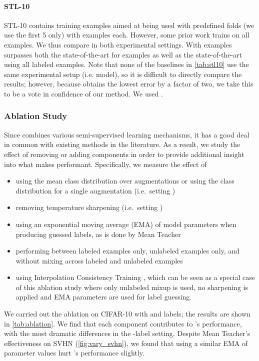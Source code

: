 \documentclass{article}
\begin{document}
\paragraph{STL-10}
STL-10 contains  training examples aimed at being used with  predefined folds (we use the first 5 only) with  examples each.
However, some prior work trains on all  examples.
We thus compare in both experimental settings.
With  examples  surpasses both the state-of-the-art for  examples as well as the state-of-the-art using all  labeled examples.
Note that none of the baselines in \cref{tab:stl10} use the same experimental setup (i.e. model), so it is difficult to directly compare the results; however, because  obtains the lowest error by a factor of two, we take this to be a vote in confidence of our method.
We used .

\subsubsection{Ablation Study}
\label{sec:ablation}

Since  combines various semi-supervised learning mechanisms, it has a good deal in common with existing methods in the literature.
As a result, we study the effect of removing or adding components in order to provide additional insight into what makes  performant.
Specifically, we measure the effect of
\begin{itemize}
    \item using the mean class distribution over  augmentations or using the class distribution for a single augmentation (i.e.\ setting )
    \item removing temperature sharpening (i.e.\ setting )
    \item using an exponential moving average (EMA) of model parameters when producing guessed labels, as is done by Mean Teacher \cite{tarvainen2017weight}
    \item performing  between labeled examples only, unlabeled examples only, and without mixing across labeled and unlabeled examples
    \item using Interpolation Consistency Training \cite{verma2019interpolation}, which can be seen as a special case of this ablation study where only unlabeled mixup is used, no sharpening is applied and EMA parameters are used for label guessing.
\end{itemize}
We carried out the ablation on CIFAR-10 with  and  labels; the results are shown in \cref{tab:ablation}.
We find that each component contributes to 's performance, with the most dramatic differences in the -label setting.
Despite Mean Teacher's effectiveness on SVHN (\cref{fig:vary_svhn}), we found that using a similar EMA of parameter values hurt 's performance slightly.
\end{document}
